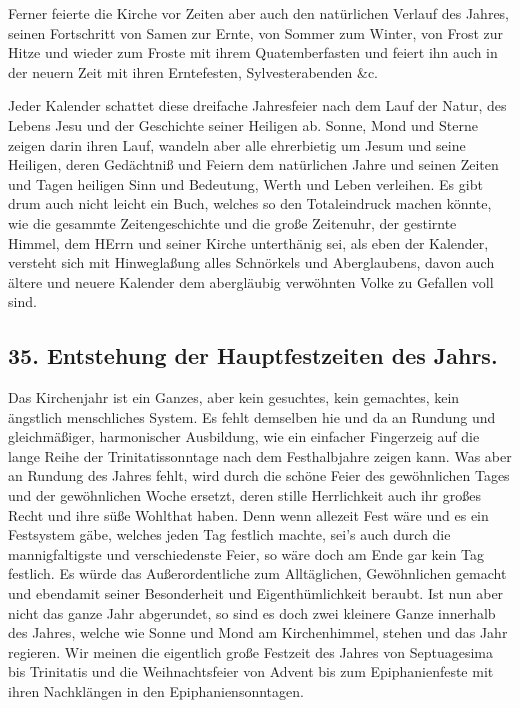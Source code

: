 Ferner feierte die Kirche vor Zeiten aber auch den natürlichen
Verlauf des Jahres, seinen Fortschritt von Samen zur Ernte, von Sommer zum Winter, von Frost zur Hitze und wieder zum Froste mit ihrem Quatemberfasten und feiert ihn auch in der neuern Zeit mit ihren Erntefesten, Sylvesterabenden \&c.

Jeder Kalender schattet diese dreifache Jahresfeier nach dem Lauf der Natur, des Lebens Jesu und der Geschichte seiner Heiligen ab. Sonne, Mond und Sterne zeigen darin ihren Lauf, wandeln aber alle ehrerbietig um Jesum und seine Heiligen, deren Gedächtniß und Feiern dem natürlichen Jahre und seinen Zeiten und Tagen heiligen Sinn und Bedeutung, Werth und Leben verleihen. Es gibt drum auch nicht leicht ein Buch, welches so den Totaleindruck machen könnte, wie die gesammte Zeitengeschichte und die große Zeitenuhr, der gestirnte Himmel, dem HErrn und seiner Kirche unterthänig sei, als eben der Kalender, versteht sich mit Hinweglaßung alles Schnörkels und Aberglaubens, davon auch ältere und neuere Kalender dem abergläubig verwöhnten Volke zu Gefallen voll sind.

\subsection*{35. Entstehung der Hauptfestzeiten des Jahrs.}

Das Kirchenjahr ist ein Ganzes, aber kein gesuchtes, kein gemachtes, kein ängstlich menschliches System. Es fehlt demselben hie und da an Rundung und gleichmäßiger, harmonischer Ausbildung, wie ein einfacher Fingerzeig auf die lange Reihe der Trinitatissonntage nach dem Festhalbjahre
zeigen kann. Was aber an Rundung des Jahres fehlt, wird durch die schöne Feier des gewöhnlichen Tages und der gewöhnlichen Woche ersetzt, deren stille Herrlichkeit auch ihr großes Recht und ihre süße Wohlthat haben. Denn wenn allezeit Fest wäre und es ein Festsystem gäbe, welches jeden Tag festlich machte, sei’s auch durch die mannigfaltigste und verschiedenste Feier, so wäre doch am Ende gar kein Tag festlich. Es würde das Außerordentliche zum Alltäglichen, Gewöhnlichen gemacht und ebendamit seiner Besonderheit und Eigenthümlichkeit beraubt. Ist nun aber nicht das ganze Jahr abgerundet, so sind es doch zwei kleinere Ganze innerhalb des Jahres, welche wie Sonne und Mond am Kirchenhimmel, stehen und das Jahr regieren. Wir meinen die eigentlich große Festzeit des Jahres von Septuagesima bis Trinitatis und die Weihnachtsfeier von Advent bis zum Epiphanienfeste mit ihren Nachklängen in den Epiphaniensonntagen.

